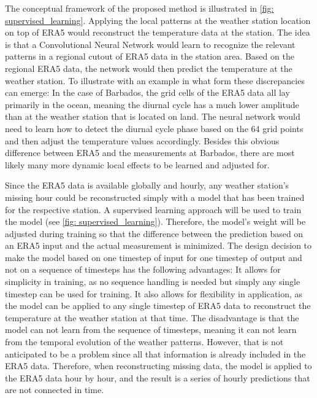 The conceptual framework of the proposed method is illustrated in \autoref{fig: supervised_learning}.
Applying the local patterns at the weather station location on top of ERA5 would reconstruct the temperature data at the station.
The idea is that a Convolutional Neural Network would learn to recognize the relevant patterns in a regional cutout of ERA5 data in the station area.
Based on the regional ERA5 data, the network would then predict the temperature at the weather station.
To illustrate with an example in what form these discrepancies can emerge:
In the case of Barbados, the grid cells of the ERA5 data all lay primarily in the ocean, meaning the diurnal cycle has a much lower amplitude than at the weather station that is located on land.
The neural network would need to learn how to detect the diurnal cycle phase based on the 64 grid points and then adjust the temperature values accordingly.
Besides this obvious difference between ERA5 and the measurements at Barbados, there are most likely many more dynamic local effects to be learned and adjusted for.

Since the ERA5 data is available globally and hourly, any weather station's missing hour could be reconstructed simply with a model that has been trained for the respective station.
A supervised learning approach will be used to train the model (see \autoref{fig: supervised_learning}).
Therefore, the model's weight will be adjusted during training so that the difference between the prediction based on an ERA5 input and the actual measurement is minimized.
The design decision to make the model based on one timestep of input for one timestep of output and not on a sequence of timesteps has the following advantages: It allows for simplicity in training, as no sequence handling is needed but simply any single timestep can be used for training.
It also allows for flexibility in application, as the model can be applied to any single timestep of ERA5 data to reconstruct the temperature at the weather station at that time.
The disadvantage is that the model can not learn from the sequence of timesteps, meaning it can not learn from the temporal evolution of the weather patterns.
However, that is not anticipated to be a problem since all that information is already included in the ERA5 data.
Therefore, when reconstructing missing data, the model is applied to the ERA5 data hour by hour, and the result is a series of hourly predictions that are not connected in time.

